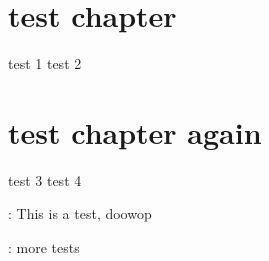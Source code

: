 \documentclass[ebook,12pt,oneside]{memoir}
\begin{document}
\frontmatter
\tableofcontents

\mainmatter
\chapter{test chapter}
test 1
\breaker
test 2
\chapter{test chapter again}
test 3
test 4


 

\begin{des}
	\item[\cl2:] This is a test, doowop
	\item[\di2:] more tests
\end{des}	


\backmatter
\end{document}
